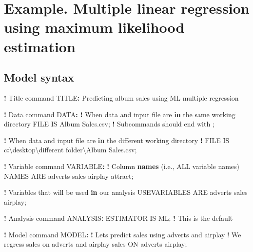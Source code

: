 \documentclass[
]{book}
\newenvironment{Shaded}{\begin{snugshade}}{\end{snugshade}}
\newcommand{\ControlFlowTok}[1]{\textcolor[rgb]{0.13,0.29,0.53}{\textbf{#1}}}
\newcommand{\FunctionTok}[1]{\textcolor[rgb]{0.13,0.29,0.53}{\textbf{#1}}}
\newcommand{\NormalTok}[1]{#1}
\newcommand{\SpecialCharTok}[1]{\textcolor[rgb]{0.81,0.36,0.00}{\textbf{#1}}}
\newcommand{\StringTok}[1]{\textcolor[rgb]{0.31,0.60,0.02}{#1}}
\begin{document}
\hypertarget{example.-multiple-linear-regression-using-maximum-likelihood-estimation}{%
\section{Example. Multiple linear regression using maximum likelihood estimation}\label{example.-multiple-linear-regression-using-maximum-likelihood-estimation}}

\hypertarget{model-syntax}{%
\subsection{Model syntax}\label{model-syntax}}

\begin{Shaded}
\begin{Highlighting}[]
\SpecialCharTok{!}\NormalTok{ Title command}
\NormalTok{TITLE}\SpecialCharTok{:}\NormalTok{ Predicting album sales using ML multiple regression}

\SpecialCharTok{!}\NormalTok{ Data command}
\NormalTok{DATA}\SpecialCharTok{:}
    \SpecialCharTok{!}\NormalTok{ When data and input file are }\ControlFlowTok{in}\NormalTok{ the same working directory}
\NormalTok{    FILE IS Album Sales.csv; }\SpecialCharTok{!}\NormalTok{ Subcommands should end with ;}

    \SpecialCharTok{!}\NormalTok{ When data and input file are }\ControlFlowTok{in}\NormalTok{ the different working directory}
    \SpecialCharTok{!}\NormalTok{ FILE IS c}\SpecialCharTok{:}\NormalTok{\textbackslash{}desktop\textbackslash{}different folder\textbackslash{}Album Sales.csv;}

\SpecialCharTok{!}\NormalTok{ Variable command}
\NormalTok{VARIABLE}\SpecialCharTok{:}
    \SpecialCharTok{!}\NormalTok{ Column }\FunctionTok{names}\NormalTok{ (i.e., ALL variable names)}
\NormalTok{    NAMES ARE adverts sales airplay attract;}
    
    \SpecialCharTok{!}\NormalTok{ Variables that will be used }\ControlFlowTok{in}\NormalTok{ our analysis}
\NormalTok{    USEVARIABLES ARE adverts sales airplay;}
    
\SpecialCharTok{!}\NormalTok{ Analysis command}
\NormalTok{ANALYSIS}\SpecialCharTok{:}
\NormalTok{    ESTIMATOR IS ML; }\SpecialCharTok{!}\NormalTok{ This is the default}

\SpecialCharTok{!}\NormalTok{ Model command}
\NormalTok{MODEL}\SpecialCharTok{:}
    \SpecialCharTok{!}\NormalTok{ Let}\StringTok{\textquotesingle{}s predict sales using adverts and airplay}
\StringTok{    ! We regress sales on adverts and airplay}
\StringTok{    sales ON adverts airplay;}


\end{Highlighting}
\end{Shaded}
\end{document}
